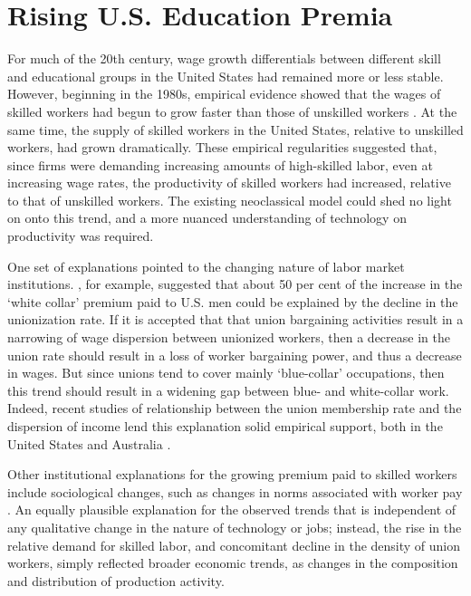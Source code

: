 \section{Rising U.S. Education Premia}\label{sec:risingpremia}

For much of the 20th century, wage growth differentials between different skill and educational groups in the United States had remained more or less stable. However, beginning in the 1980s, empirical evidence showed that the wages of skilled workers had begun to grow faster than those of unskilled workers \citep{Juhn1993}. At the same time, the supply of skilled workers in the United States, relative to unskilled workers, had grown dramatically. These empirical regularities suggested that, since firms were demanding increasing amounts of high-skilled labor, even at increasing wage rates, the productivity of skilled workers had increased, relative to that of unskilled workers. The existing neoclassical model could shed no light on onto this trend, and a more nuanced understanding of technology on productivity was required.

One set of explanations pointed to the changing nature of labor market institutions. \citet{Freeman1994}, for example, suggested that about 50 per cent of the increase in the `white collar' premium paid to U.S. men could be explained by the decline in the unionization rate. If it is accepted that that union bargaining activities result in a narrowing of wage dispersion between unionized workers, then a decrease in the union rate should result in a loss of worker bargaining power, and thus a decrease in wages. But since unions tend to cover mainly `blue-collar' occupations, then this trend should result in a widening gap between blue- and white-collar work. Indeed, recent studies of relationship between the union membership rate and the dispersion of income lend this explanation solid empirical support, both in the United States \citep{Card2004,DiNardo1996} and Australia \citep{Borland1996}.

Other institutional explanations for the growing premium paid to skilled workers include sociological changes, such as changes in norms associated with worker pay \citep{Mitchell1989}. An equally plausible explanation for the observed trends that is independent of any qualitative change in the nature of technology or jobs; instead, the rise in the relative demand for skilled labor, and concomitant decline in the density of union workers,  simply reflected broader economic trends, as changes in the composition and distribution of production activity.


